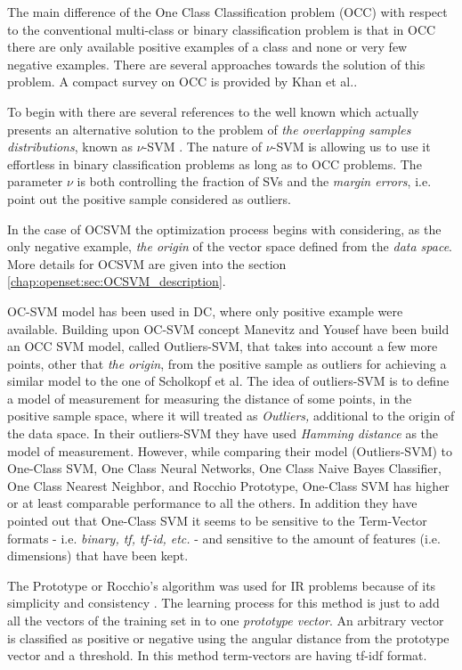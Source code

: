 The main difference of the One Class Classification problem (OCC) with respect to the conventional multi-class or binary classification problem is that in OCC there are only available positive examples of a class and none or very few negative examples. There are several approaches towards the solution of this problem. A compact survey on OCC is provided by Khan et al.\parencite{khan2010survey}. 

To begin with there are several references to the well known \parencite{scholkopf1999estimating} which actually presents an alternative solution to the problem of \textit{the overlapping samples distributions}, known as $\nu$-SVM \parencite{bishop2006}. The nature of $\nu$-SVM is allowing us to use it effortless in binary classification problems as long as to OCC problems. The parameter $\nu$ is both controlling the fraction of SVs and the \textit{margin errors}, i.e. point out the positive sample considered as outliers. 

In the case of OCSVM the optimization process begins with considering, as the only negative example, \textit{the origin} of the vector space defined from the \textit{data space}. More details for OCSVM are given into the section \ref{chap:openset:sec:OCSVM_description}.

OC-SVM model has been used in DC, where only positive example were available. Building upon OC-SVM concept Manevitz and Yousef \parencite{manevitz2002one,khan2010survey}have been build an OCC SVM model, called Outliers-SVM, that takes into account a few more points, other that \textit{the origin}, from the positive sample as outliers for achieving a similar model to the one of Scholkopf et al. The idea of outliers-SVM is to define a model of measurement for measuring the distance of some points, in the positive sample space, where it will treated as \textit{Outliers,} additional to the origin of the data space. In their outliers-SVM they have used \textit{Hamming distance} as the model of measurement. However, while comparing their model (Outliers-SVM) to One-Class SVM, One Class Neural Networks, One Class Naive Bayes Classifier, One Class Nearest Neighbor, and Rocchio Prototype, One-Class SVM has higher or at least comparable performance to all the others. In addition they have pointed out that One-Class SVM it seems to be sensitive to the Term-Vector formats - i.e. \textit{binary, tf, tf-id, etc.} - and sensitive to the amount of features (i.e. dimensions) that have been kept.

The Prototype or Rocchio's algorithm was used for IR problems because of its simplicity and consistency \parencite{joachims1997probabilistic}. The learning process for this method is just to add all the vectors of the training set in to one \textit{prototype vector}. An arbitrary vector is classified as positive or negative using the angular distance from the prototype vector and a threshold. In this method term-vectors are having tf-idf format. 

